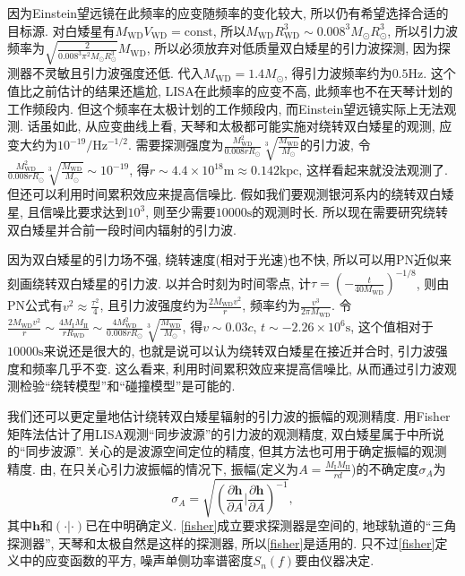 \documentclass[12pt]{ctexart}
\def\b{\boldsymbol}
\def\p{\partial}
\begin{document}
因为Einstein望远镜在此频率的应变随频率的变化较大, 所以仍有希望选择合适的目标源. 对白矮星有$M_\text{WD}V_\text{WD}=\text{const}$\cite{Carroll2007}, 所以$M_\text{WD}R_\text{WD}^3\sim0.008^3M_\odot R_\odot^3$, 所以引力波频率为$\sqrt{\frac{2}{0.008^3\pi^2M_\odot R_\odot^3}}M_\text{WD}$, 所以必须放弃对低质量双白矮星的引力波探测, 因为探测器不灵敏且引力波强度还低. 代入$M_\text{WD}=1.4M_\odot$, 得引力波频率约为$0.5\text{Hz}$. 这个值比之前估计的结果还尴尬, LISA在此频率的应变不高\cite{Wang2020}, 此频率也不在天琴\cite{Luo2016}计划的工作频段内. 但这个频率在太极\cite{Luo2020}计划的工作频段内, 而Einstein望远镜实际上无法观测\cite{Wang2020}. 话虽如此, 从应变曲线上看, 天琴和太极都可能实施对绕转双白矮星的观测, 应变大约为$10^{-19}/\text{Hz}^{-1/2}$. 需要探测强度为$\frac{M_\text{WD}^2}{0.008r R_\odot}\sqrt[3]{\frac{M_\text{WD}}{M_\odot}}$的引力波, 令$\frac{M_\text{WD}^2}{0.008r R_\odot}\sqrt[3]{\frac{M_\text{WD}}{M_\odot}}\sim10^{-19}$, 得$r\sim4.4\times10^{18}\text{m}\approx0.142\text{kpc}$, 这样看起来就没法观测了. 但还可以利用时间累积效应来提高信噪比. 假如我们要观测银河系内的绕转双白矮星, 且信噪比要求达到$10^3$, 则至少需要$10000\text{s}$的观测时长. 所以现在需要研究绕转双白矮星并合前一段时间内辐射的引力波.

因为双白矮星的引力场不强, 绕转速度(相对于光速)也不快, 所以可以用PN近似来刻画绕转双白矮星的引力波. 以并合时刻为时间零点, 计$\tau=(-\frac{t}{40M_\text{WD}})^{-1/8}$, 则由PN公式\cite{Sathyaprakash2009}有$v^2\approx\frac{\tau^2}{4}$, 且引力波强度约为$\frac{2M_\text{WD}v^2}{r}$, 频率约为$\frac{v^3}{2\pi M_\text{WD}}$. 令$\frac{2M_\text{WD}v^2}{r}\sim\frac{4M_\text{I}M_\text{II}}{r R_\text{WD}}\sim\frac{4M_\text{WD}^2}{0.008r R_\odot}\sqrt[3]{\frac{M_\text{WD}}{M_\odot}}$, 得$v\sim0.03c$, $t\sim-2.26\times10^6\text{s}$, 这个值相对于$10000\text{s}$来说还是很大的, 也就是说可以认为绕转双白矮星在接近并合时, 引力波强度和频率几乎不变. 这么看来, 利用时间累积效应来提高信噪比, 从而通过引力波观测检验``绕转模型''和``碰撞模型''是可能的.

我们还可以更定量地估计绕转双白矮星辐射的引力波的振幅的观测精度. \cite{Cutler1998}用Fisher矩阵法估计了用LISA观测``同步波源''的引力波的观测精度, 双白矮星属于\cite{Cutler1998}中所说的``同步波源''. \cite{Cutler1998}关心的是波源空间定位的精度, 但其方法也可用于确定振幅的观测精度. 由\cite{Cutler1998}, 在只关心引力波振幅的情况下, 振幅(定义为$A=\frac{M_\text{I}M_\text{II}}{rd}$)的不确定度$\sigma_A$为
\begin{equation}
    \sigma_A=\sqrt{\left(\frac{\p \b{h}}{\p A}\Big|\frac{\p \b{h}}{\p A}\right)^{-1}},\label{fisher}
\end{equation}
其中$\b{h}$和$\left(\cdot|\cdot\right)$已在\cite{Cutler1998}中明确定义. \eqref{fisher}成立要求探测器是空间的, 地球轨道的``三角探测器'', 天琴和太极自然是这样的探测器, 所以\eqref{fisher}是适用的. 只不过\eqref{fisher}定义中的应变函数的平方, 噪声单侧功率谱密度$S_n(f)$\cite{Wang2020}要由仪器决定.
\end{document}
